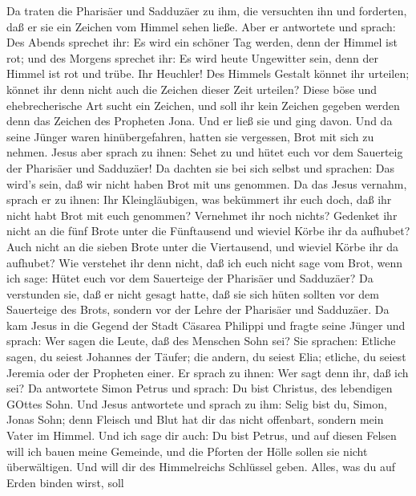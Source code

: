  Da traten die Pharisäer und Sadduzäer zu ihm, die
versuchten ihn und forderten, daß er sie ein Zeichen vom Himmel sehen
ließe.  Aber er antwortete und sprach: Des Abends sprechet
ihr: Es wird ein schöner Tag werden, denn der Himmel ist rot;
 und des Morgens sprechet ihr: Es wird heute Ungewitter
sein, denn der Himmel ist rot und trübe. Ihr Heuchler! Des Himmels
Gestalt könnet ihr urteilen; könnet ihr denn nicht auch die Zeichen
dieser Zeit urteilen?  Diese böse und ehebrecherische Art
sucht ein Zeichen, und soll ihr kein Zeichen gegeben werden denn das
Zeichen des Propheten Jona. Und er ließ sie und ging davon. 
Und da seine Jünger waren hinübergefahren, hatten sie vergessen, Brot
mit sich zu nehmen.  Jesus aber sprach zu ihnen: Sehet zu
und hütet euch vor dem Sauerteig der Pharisäer und Sadduzäer!
 Da dachten sie bei sich selbst und sprachen: Das wird's
sein, daß wir nicht haben Brot mit uns genommen.  Da das
Jesus vernahm, sprach er zu ihnen: Ihr Kleingläubigen, was bekümmert ihr
euch doch, daß ihr nicht habt Brot mit euch genommen? 
Vernehmet ihr noch nichts? Gedenket ihr nicht an die fünf Brote unter
die Fünftausend und wieviel Körbe ihr da aufhubet?  Auch
nicht an die sieben Brote unter die Viertausend, und wieviel Körbe ihr
da aufhubet?  Wie verstehet ihr denn nicht, daß ich euch
nicht sage vom Brot, wenn ich sage: Hütet euch vor dem Sauerteige der
Pharisäer und Sadduzäer?  Da verstunden sie, daß er nicht
gesagt hatte, daß sie sich hüten sollten vor dem Sauerteige des Brots,
sondern vor der Lehre der Pharisäer und Sadduzäer.  Da kam
Jesus in die Gegend der Stadt Cäsarea Philippi und fragte seine Jünger
und sprach: Wer sagen die Leute, daß des Menschen Sohn sei?
 Sie sprachen: Etliche sagen, du seiest Johannes der
Täufer; die andern, du seiest Elia; etliche, du seiest Jeremia oder der
Propheten einer.  Er sprach zu ihnen: Wer sagt denn ihr,
daß ich sei?  Da antwortete Simon Petrus und sprach: Du
bist Christus, des lebendigen GOttes Sohn.  Und Jesus
antwortete und sprach zu ihm: Selig bist du, Simon, Jonas Sohn; denn
Fleisch und Blut hat dir das nicht offenbart, sondern mein Vater im
Himmel.  Und ich sage dir auch: Du bist Petrus, und auf
diesen Felsen will ich bauen meine Gemeinde, und die Pforten der Hölle
sollen sie nicht überwältigen.  Und will dir des
Himmelreichs Schlüssel geben. Alles, was du auf Erden binden wirst, soll
